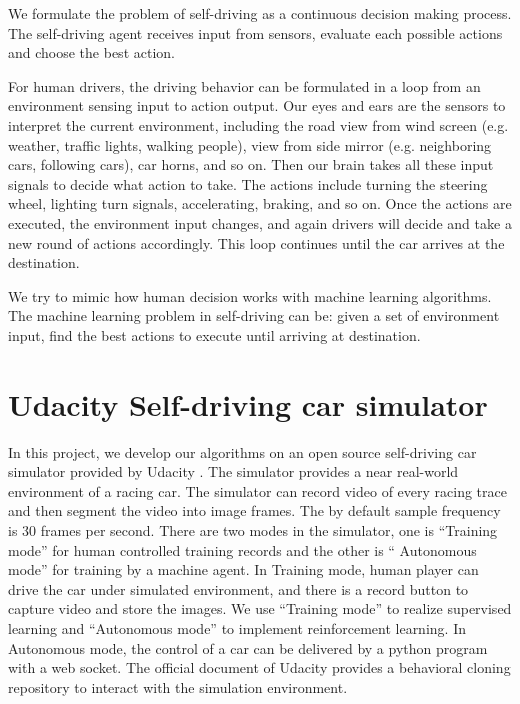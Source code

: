 \documentclass[a4paper]{article}
\begin{document}
We formulate the problem of self-driving as a continuous decision making process. The
self-driving agent receives input from sensors, evaluate each possible actions and choose
the best action.

For human drivers, the driving behavior can be formulated in a loop from an environment sensing
input to action output. Our eyes and ears are the sensors to interpret the current environment,
including the road view from wind screen (e.g. weather, traffic lights, walking people), view
from side mirror (e.g. neighboring cars, following cars), car horns, and so on. Then our brain
takes all these input signals to decide what action to take. The actions include turning the
steering wheel, lighting turn signals, accelerating, braking, and so on. Once the actions are
executed, the environment input changes, and again drivers will decide and take a new round of
actions accordingly. This loop continues until the car arrives at the destination. 

We try to mimic how human decision works with machine learning algorithms. The machine learning
problem in self-driving can be: given a set of environment input, find the best actions to
execute until arriving at destination.


\section{Udacity Self-driving car simulator}

In this project, we develop our algorithms on an open source self-driving car simulator provided
by Udacity \cite{simulator}. The simulator provides a near real-world environment of a racing 
car. The simulator can record video of every racing trace and then segment the video into image
frames. The by default sample frequency is 30 frames per second. There are two modes in the 
simulator, one is ``Training mode'' for human controlled training records and the other is ``
Autonomous mode'' for training by a machine agent. In Training mode, human player can drive the
car under simulated environment, and there is a record button to capture video and store the images.
We use ``Training mode'' to realize supervised learning and ``Autonomous mode'' to implement 
reinforcement learning.
In Autonomous mode, the control of a car can be delivered by a python program with a web socket.
The official document of Udacity provides a behavioral cloning repository \cite{behavior} to interact
with the simulation environment. 
\end{document}
